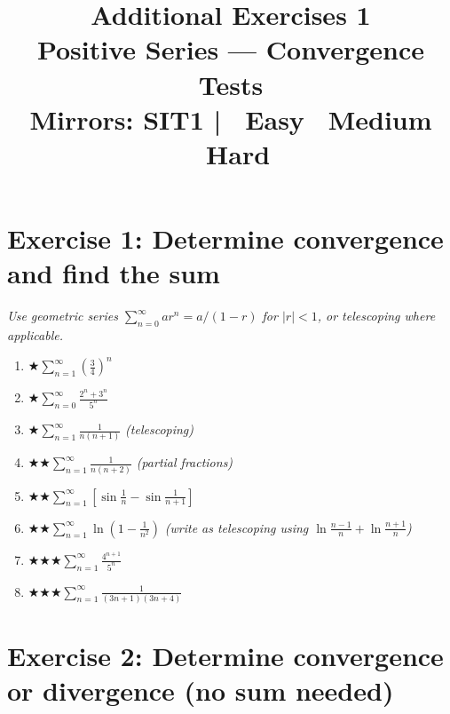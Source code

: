 \documentclass[12pt,a4paper]{article}
\title{\textbf{Additional Exercises 1}\\
\large Positive Series --- Convergence Tests\\[4pt]
\normalsize Mirrors: SIT1 \quad|\quad
\easy\ Easy \quad \medium\ Medium \quad \hard\ Hard}
\date{}
\newcommand{\easy}{{\color{green!60!black}$\bigstar$}}
\newcommand{\medium}{{\color{orange}$\bigstar\bigstar$}}
\newcommand{\hard}{{\color{red}$\bigstar\bigstar\bigstar$}}
\begin{document}
\maketitle
\thispagestyle{empty}

\section*{Exercise 1: Determine convergence and find the sum}

\emph{Use geometric series $\sum_{n=0}^\infty ar^n = a/(1-r)$ for $|r|<1$,
or telescoping where applicable.}

\begin{enumerate}[leftmargin=*, label=(\alph*)]

\item \easy\quad $\displaystyle\sum_{n=1}^{\infty}\left(\frac{3}{4}\right)^n$

\item \easy\quad $\displaystyle\sum_{n=0}^{\infty}\frac{2^n+3^n}{5^n}$

\item \easy\quad $\displaystyle\sum_{n=1}^{\infty}\frac{1}{n(n+1)}$
\quad\emph{(telescoping)}

\item \medium\quad $\displaystyle\sum_{n=1}^{\infty}\frac{1}{n(n+2)}$
\quad\emph{(partial fractions)}

\item \medium\quad $\displaystyle\sum_{n=1}^{\infty}\left[\sin\!\frac{1}{n}-\sin\!\frac{1}{n+1}\right]$

\item \medium\quad $\displaystyle\sum_{n=1}^{\infty}\ln\!\left(1-\frac{1}{n^2}\right)$
\quad\emph{(write as telescoping using $\ln\frac{n-1}{n}+\ln\frac{n+1}{n}$)}

\item \hard\quad $\displaystyle\sum_{n=1}^{\infty}\frac{4^{n+1}}{5^n}$

\item \hard\quad $\displaystyle\sum_{n=1}^{\infty}\frac{1}{(3n+1)(3n+4)}$

\end{enumerate}

\section*{Exercise 2: Determine convergence or divergence (no sum needed)}
\end{document}

